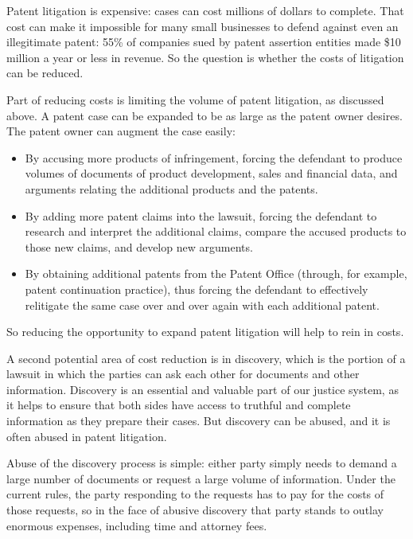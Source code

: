 \documentclass[11pt,twocolumn,titlepage]{article}
\begin{document}
Patent litigation is expensive: cases can cost millions of dollars to
complete. That cost can make it impossible for many small
businesses to defend against even an illegitimate patent: 55\% of companies sued
by patent assertion entities made \$10 million a year or less in
revenue. So the question is whether the costs of
litigation can be reduced.

Part of reducing costs is limiting the volume of patent litigation, as discussed
above.
A patent case can be expanded to be as large as the patent owner
desires. The patent owner can augment the case easily:
\begin{itemize}
\item By accusing more products of infringement, forcing the defendant to
produce volumes of documents of product development, sales and financial
data, and arguments relating the additional products and the patents.
\item By adding more patent claims into the lawsuit, forcing the defendant to
research and interpret the additional claims, compare the accused products to
those new claims, and develop new arguments.
\item By obtaining additional patents from the Patent Office (through, for
example, patent continuation practice), thus forcing the defendant to
effectively relitigate the same case over and over again with each additional
patent.
\end{itemize}
So reducing the opportunity to expand patent litigation will help to rein in
costs.

A second potential area of cost reduction is in discovery, which is the portion
of a lawsuit in which the parties can ask each other for documents and other
information.
Discovery is an essential and valuable part of our justice system,
as it helps to ensure that both sides have access to truthful and complete
information as they prepare their cases. But discovery can be abused, and it is
often abused in patent litigation.

Abuse of the discovery process is simple: either party simply needs to demand a
large number of documents or request a large volume of information. Under the
current rules, the party responding to the requests has to pay for the costs of
those requests, so in the face of abusive discovery that party stands to outlay
enormous expenses, including time and attorney fees.
\end{document}

